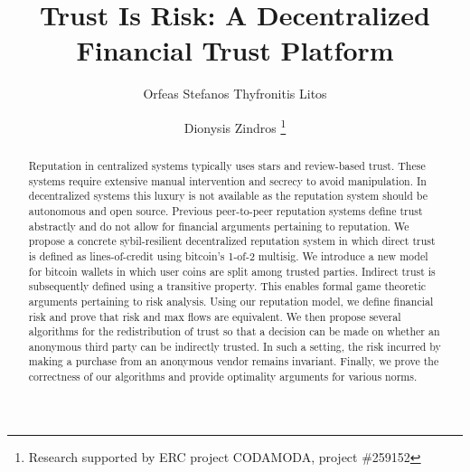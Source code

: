 \documentclass[11pt]{llncs}
\begin{document}
\title{Trust Is Risk: A Decentralized Financial Trust Platform}
\author{Orfeas Stefanos Thyfronitis Litos \and Dionysis Zindros\fnmsep
                                                       \thanks{Research supported by ERC project CODAMODA, project \#259152}}
\maketitle

  \begin{abstract}
     Reputation in centralized systems typically uses stars and review-based trust.  These systems require extensive manual
     intervention and secrecy to avoid manipulation. In decentralized systems this luxury is not available as the reputation
     system should be autonomous and open source. Previous peer-to-peer reputation systems define trust abstractly and do not
     allow for financial arguments pertaining to reputation. We propose a concrete sybil-resilient decentralized reputation
     system in which direct trust is defined as lines-of-credit using bitcoin's \cite{bitcoin} 1-of-2 multisig. We introduce
     a new model for bitcoin wallets in which user coins are split among trusted parties. Indirect trust is subsequently
     defined using a transitive property. This enables formal game theoretic arguments pertaining to risk analysis.  Using
     our reputation model, we define financial risk and prove that risk and max flows are equivalent. We then propose several
     algorithms for the redistribution of trust so that a decision can be made on whether an anonymous third party can be
     indirectly trusted. In such a setting, the risk incurred by making a purchase from an anonymous vendor remains
     invariant. Finally, we prove the correctness of our algorithms and provide optimality arguments for various norms.
  \end{abstract}
\end{document}
